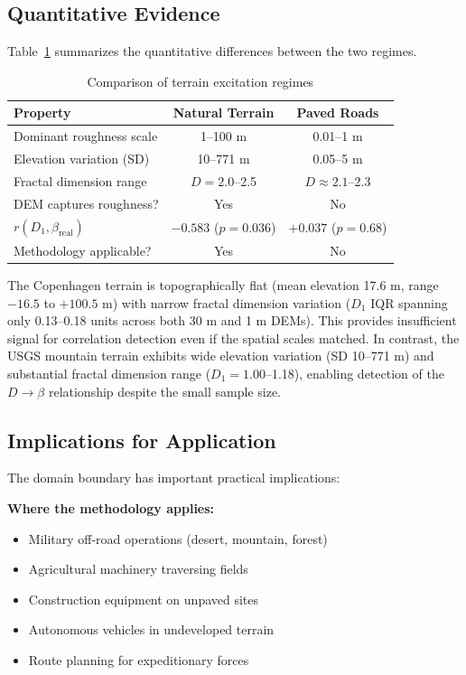 \documentclass[11pt,letterpaper]{article}
\begin{document}
\subsection{Quantitative Evidence}

Table~\ref{tab:regimes} summarizes the quantitative differences between the two regimes.

\begin{table}[h]
\centering
\caption{Comparison of terrain excitation regimes}
\label{tab:regimes}
\small
\begin{tabular}{lcc}
\hline
\textbf{Property} & \textbf{Natural Terrain} & \textbf{Paved Roads} \\
\hline
Dominant roughness scale & 1--100 m & 0.01--1 m \\
Elevation variation (SD) & 10--771 m & 0.05--5 m \\
Fractal dimension range & $D = 2.0$--2.5 & $D \approx 2.1$--2.3 \\
DEM captures roughness? & Yes & No \\
$r(D_1, \beta_{\text{real}})$ & $-0.583$ ($p=0.036$) & $+0.037$ ($p=0.68$) \\
Methodology applicable? & Yes & No \\
\hline
\end{tabular}
\end{table}

The Copenhagen terrain is topographically flat (mean elevation 17.6 m, range $-16.5$ to $+100.5$ m) with narrow fractal dimension variation ($D_1$ IQR spanning only 0.13--0.18 units across both 30 m and 1 m DEMs). This provides insufficient signal for correlation detection even if the spatial scales matched. In contrast, the USGS mountain terrain exhibits wide elevation variation (SD 10--771 m) and substantial fractal dimension range ($D_1 = 1.00$--1.18), enabling detection of the $D \rightarrow \beta$ relationship despite the small sample size.

\subsection{Implications for Application}

The domain boundary has important practical implications:

\textbf{Where the methodology applies:}
\begin{itemize}
\item Military off-road operations (desert, mountain, forest)
\item Agricultural machinery traversing fields
\item Construction equipment on unpaved sites
\item Autonomous vehicles in undeveloped terrain
\item Route planning for expeditionary forces
\end{itemize}
\end{document}
